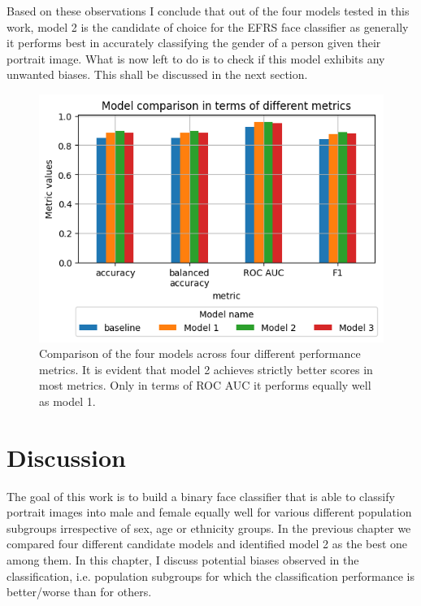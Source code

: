 \documentclass{article}
\begin{document}
Based on these observations I conclude that out of the four models tested in this work, model 2 is the candidate of choice for the EFRS face classifier as generally it performs best in accurately classifying the gender of a person given their portrait image. What is now left to do is to check if this model exhibits any unwanted biases. This shall be discussed in the next section.
\begin{figure}[t!]
  \centering
  \includegraphics[width=\textwidth]{imgs/model_comparison.png}
  \caption{Comparison of the four models across four different performance metrics. It is evident that model 2 achieves strictly better scores in most metrics. Only in terms of ROC AUC it performs equally well as model 1.}
  \label{fig:metriccomp}
\end{figure}
\FloatBarrier
\section{Discussion}
The goal of this work is to build a binary face classifier that is able to classify portrait images into male and female equally well for various different population subgroups irrespective of sex, age or ethnicity groups. In the previous chapter we compared four different candidate models and identified model 2 as the best one among them. In this chapter, I discuss potential biases observed in the classification, i.e. population subgroups for which the classification performance is better/worse than for others.
\end{document}
